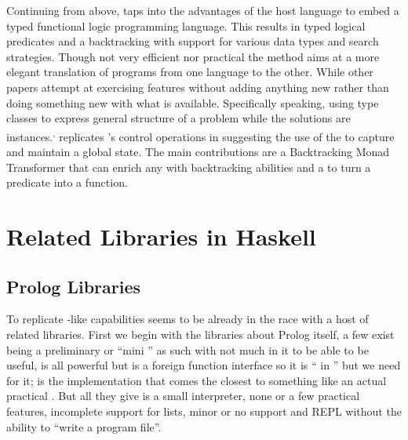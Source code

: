 \documentclass[thesis-solanki.tex]{subfiles}
\begin{document}
Continuing from above, \cite{claessen2000typed} taps into the advantages of the host language to embed a typed
functional logic programming language.
This results in typed logical predicates and a backtracking  with support for various data
types and search strategies.
Though not very efficient nor practical the method aims at a more elegant translation of programs from one language
to the other.
While other papers \cite{erwig2004escape} attempt at exercising  features without adding
anything new rather than doing something new with what is available.
Specifically speaking, using  type classes to express general structure of a problem while the
solutions are instances.\textsuperscript{,}
\cite{hinze1998prological} replicates 's control operations in  suggesting the
use of the   to capture and maintain a global state.
The main contributions are a Backtracking Monad Transformer that can enrich any  with
backtracking abilities and a  to turn a  predicate into a
 function.



\section{Related Libraries in Haskell}
\subsection{Prolog Libraries}

To replicate -like
capabilities  seems to be already in the race
with a host of related libraries.
First we begin with the libraries about Prolog
itself,
a few exist \cite{nanoprolog-lib} being a preliminary or
``mini '' as such with not much in it to be able to be useful, \cite{hswip-lib}
is all powerful but is a foreign function interface so it is `` in '' but we
need  for it;
\cite{prolog-lib}
is the implementation that comes the closest
to something like an actual practical .
But all they give is a small interpreter, none or a few practical features, incomplete support for lists, minor or
no  support and  REPL without the ability to ``write a  program
file''.
\end{document}

